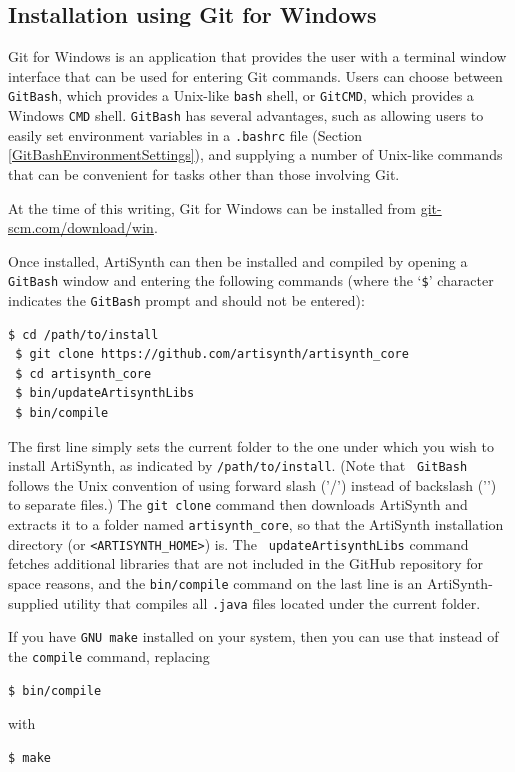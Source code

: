 \ifWindows
\subsection{Installation using Git for Windows}
\label{GitForWindows}

Git for Windows is an application that provides the user with a
terminal window interface that can be used for entering Git commands.
Users can choose between {\tt GitBash}, which provides a Unix-like
{\tt bash} shell, or {\tt GitCMD}, which provides a Windows {\tt CMD}
shell. {\tt GitBash} has several advantages, such as allowing users
to easily set environment variables in a {\tt .bashrc} file
(Section \ref{GitBashEnvironmentSettings}), and supplying a number of
Unix-like commands that can be convenient for tasks other than those
involving Git.

At the time of this writing, Git for Windows can be installed from
\href{https://git-scm.com/download/win}{git-scm.com/download/win}.

Once installed, ArtiSynth can then be installed and compiled by
opening a {\tt GitBash} window and entering the following commands
(where the `{\tt \$}' character indicates the {\tt GitBash} prompt
and should not be entered):
%
\begin{lstlisting}[]
 $ cd /path/to/install
 $ git clone https://github.com/artisynth/artisynth_core
 $ cd artisynth_core
 $ bin/updateArtisynthLibs
 $ bin/compile
\end{lstlisting}
%
The first line simply sets the current folder to the one under which you wish
to install ArtiSynth, as indicated by {\tt /path/to/install}.  (Note that {\tt
GitBash} follows the Unix convention of using forward slash ('/') instead of
backslash ('\BKS ') to separate files.)  The {\tt git clone} command then
downloads ArtiSynth and extracts it to a folder named {\tt artisynth\_core}, so
that the ArtiSynth installation directory (or {\tt <ARTISYNTH\_HOME>})
is. The {\tt
updateArtisynthLibs} command fetches additional libraries that are not included
in the GitHub repository for space reasons, and the {\tt bin/compile} command
on the last line is an ArtiSynth-supplied utility that compiles all {\tt .java}
files located under the current folder.

If you have {\tt GNU make} installed on your system, then you can use that
instead of the {\tt compile} command, replacing
%
\begin{lstlisting}[]
 $ bin/compile
\end{lstlisting}
%
with
%
\begin{lstlisting}[]
 $ make
\end{lstlisting}
%

